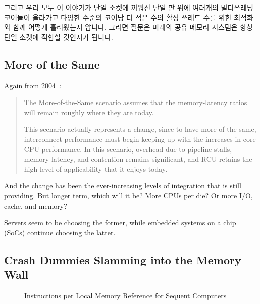 그리고 우리 모두 이 이야기가 단일 소켓에 끼워진 단일 판 위에 여러개의
멀티쓰레딩 코어들이 올라가고 다양한 수준의 코어당 더 적은 수의 활성 쓰레드 수를
위한 최적화와 함께 어떻게 흘러왔는지 압니다.
그러면 질문은 미래의 공유 메모리 시스템은 항상 단일 소켓에 적합할 것인지가
됩니다.

\subsection{More of the Same}
\label{sec:meas:More of the Same}

Again from 2004~\cite{PaulEdwardMcKenneyPhD}:

\begin{quote}
	The More-of-the-Same scenario assumes that the memory-latency
	ratios will remain roughly where they are today.

	This scenario actually represents a change, since to have more
	of the same, interconnect performance must begin keeping up
	with the  increases in core CPU performance.
	In this scenario, overhead due to pipeline stalls, memory latency,
	and contention remains significant, and RCU retains the high
	level of applicability that it enjoys today.
\end{quote}

And the change has been the ever-increasing levels of integration
that  is still providing.
But longer term, which will it be?
More CPUs per die?
Or more I/O, cache, and memory?

Servers seem to be choosing the former, while embedded systems on a chip
(SoCs) continue choosing the latter.

\subsection{Crash Dummies Slamming into the Memory Wall}
\label{sec:future:Crash Dummies Slamming into the Memory Wall}

\begin{figure}[tbp]
\centering
\epsfxsize=3in
\caption{Instructions per Local Memory Reference for Sequent Computers}
\label{fig:future:Instructions per Local Memory Reference for Sequent Computers}
\end{figure}

